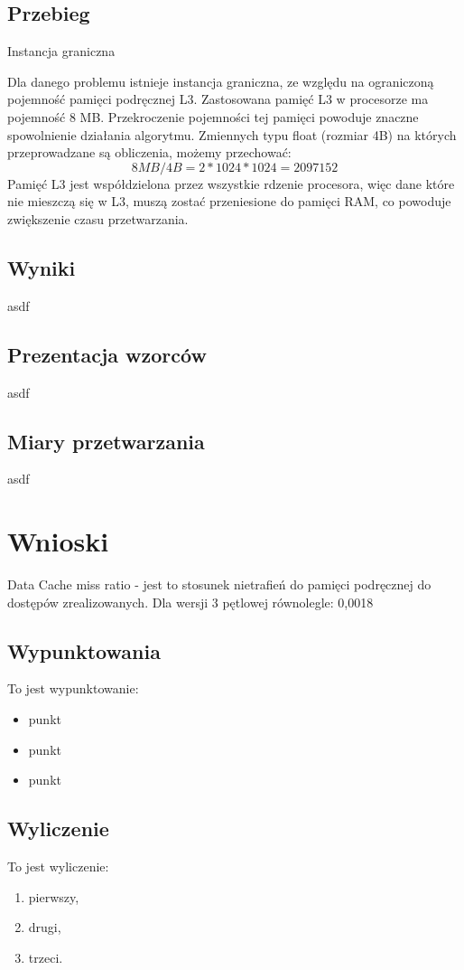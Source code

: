 \documentclass{article}
\begin{document}
\subsection{Przebieg}
Instancja graniczna

Dla danego problemu istnieje instancja graniczna, ze względu na ograniczoną pojemność pamięci podręcznej L3. Zastosowana pamięć L3 w procesorze ma pojemność 8 MB. Przekroczenie pojemności tej pamięci powoduje znaczne spowolnienie działania algorytmu. Zmiennych typu float (rozmiar 4B) na których przeprowadzane są obliczenia, możemy przechować: 
\[ 8MB/4B = 2 * 1024 * 1024 = 2097152 \]
Pamięć L3 jest współdzielona przez wszystkie rdzenie procesora, więc dane które nie mieszczą się w L3, muszą zostać przeniesione do pamięci RAM, co powoduje zwiększenie czasu przetwarzania.

\subsection{Wyniki}
asdf
\subsection{Prezentacja wzorców}
asdf
\subsection{Miary przetwarzania}
asdf

\section{Wnioski}
Data Cache miss ratio - jest to stosunek nietrafień do pamięci podręcznej do dostępów zrealizowanych.
\n
Dla wersji 3 pętlowej równolegle: 0,0018


\subsection{Wypunktowania}
To jest wypunktowanie:
\begin{itemize}
\item punkt
\item punkt
\item punkt
\end{itemize}
\subsection{Wyliczenie}
To jest wyliczenie:
\begin{enumerate}
\item pierwszy,
\item drugi,
\item trzeci.
\end{enumerate}
\end{document}

